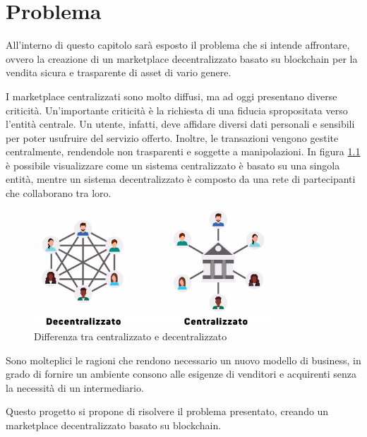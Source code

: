 \chapter{Problema}
\label{sec:problema}

All'interno di questo capitolo sarà esposto il problema che si intende affrontare, ovvero la creazione di un marketplace decentralizzato basato su blockchain per la vendita sicura e trasparente di asset di vario genere.

I marketplace centralizzati sono molto diffusi, ma ad oggi presentano diverse criticità. Un'importante criticità è la richiesta di una fiducia spropositata verso l'entità centrale. Un utente, infatti, deve affidare diversi dati personali e sensibili per poter usufruire del servizio offerto. Inoltre, le transazioni vengono gestite centralmente, rendendole non trasparenti e soggette a manipolazioni. In figura \ref{fig:defivscefi} è possibile visualizzare come un sistema centralizzato è basato su una singola entità, mentre un sistema decentralizzato è composto da una rete di partecipanti che collaborano tra loro.  

\begin{figure}[H]
    \centering
    \includegraphics[width=0.79\textwidth]{images/DEFIvsCEFI.png}
    \caption{Differenza tra centralizzato e decentralizzato}
    \label{fig:defivscefi}
\end{figure}

Sono molteplici le ragioni che rendono necessario un nuovo modello di business, in grado di fornire un ambiente consono alle esigenze di venditori e acquirenti senza la necessità di un intermediario. 

Questo progetto si propone di risolvere il problema presentato, creando un marketplace decentralizzato basato su blockchain.